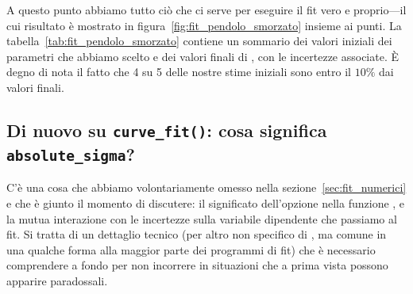 \begin{table}[htbp]
\end{table}

A questo punto abbiamo tutto ciò che ci serve per eseguire il fit
vero e proprio---il cui risultato è mostrato in
figura~\ref{fig:fit_pendolo_smorzato} insieme ai punti.
La tabella~\ref{tab:fit_pendolo_smorzato} contiene un sommario dei valori
iniziali dei parametri che abbiamo scelto e dei valori finali di
\bestfit, con le incertezze associate. \`E degno di nota il fatto che
4 su 5 delle nostre stime iniziali sono entro il $10\%$ dai valori finali.


\subsection{Di nuovo su \texttt{curve\_fit()}: cosa significa \texttt{absolute\_sigma}?}
\label{sec:dettagli_curve_fit}

C'è una cosa che abbiamo volontariamente omesso nella sezione~\ref{sec:fit_numerici}
e che è giunto il momento di discutere: il significato dell'opzione
 nella funzione , e la
mutua interazione con le incertezze sulla variabile dipendente che passiamo al
fit. Si tratta di un dettaglio tecnico (per altro non specifico di \scipy,
ma comune in una qualche forma alla maggior parte dei programmi di fit) che è
necessario comprendere a fondo per non incorrere in situazioni che a prima vista
possono apparire paradossali.

